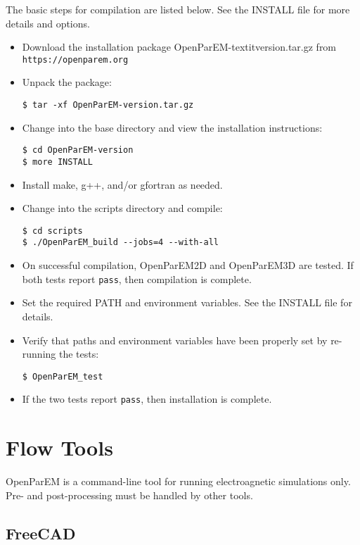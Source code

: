 \documentclass[titlepage]{article}
\renewcommand\_{\textunderscore\linebreak[1]}
\begin{document}
The basic steps for compilation are listed below.  See the INSTALL file for more details and options.
\begin{itemize}[nosep]
   \item Download the installation package OpenParEM-textit{version}.tar.gz from \verb+https://openparem.org+
   \item Unpack the package:
         \begin{Verbatim}
$ tar -xf OpenParEM-version.tar.gz
         \end{Verbatim}
   \item Change into the base directory and view the installation instructions:
         \begin{Verbatim}
$ cd OpenParEM-version
$ more INSTALL
         \end{Verbatim}
   \item Install make, g++, and/or gfortran as needed.
   \item Change into the scripts directory and compile:
         \begin{Verbatim}
$ cd scripts
$ ./OpenParEM_build --jobs=4 --with-all
         \end{Verbatim}
   \item On successful compilation, OpenParEM2D and OpenParEM3D are tested.  If both tests report \texttt{pass}, then compilation is complete.
   \item Set the required PATH and environment variables.  See the INSTALL file for details.
   \item Verify that paths and environment variables have been properly set by re-running the tests:
         \begin{Verbatim}
$ OpenParEM_test
         \end{Verbatim}
   \item If the two tests report \texttt{pass}, then installation is complete.
\end{itemize}

\section{Flow Tools}

OpenParEM is a command-line tool for running electroagnetic simulations only.  Pre- and post-processing must be handled by other tools.

\subsection{FreeCAD}
\label{sec:freecad}
\end{document}
